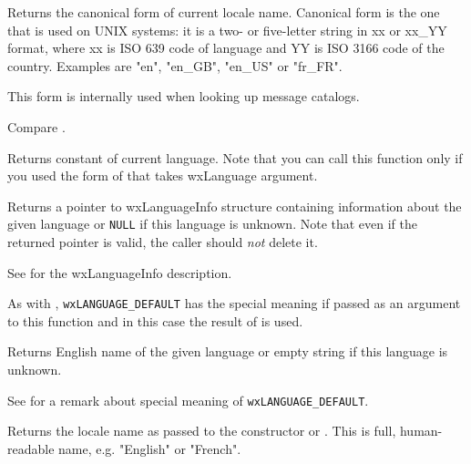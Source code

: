 Returns the canonical form of current locale name. Canonical form is the
one that is used on UNIX systems: it is a two- or five-letter string in xx or
xx\_YY format, where xx is ISO 639 code of language and YY is ISO 3166 code of
the country. Examples are "en", "en\_GB", "en\_US" or "fr\_FR".

This form is internally used when looking up message catalogs.

Compare .




\label{wxlocalegetlanguage}


Returns  constant of current language.
Note that you can call this function only if you used the form of
 that takes wxLanguage argument.


\label{wxlocalegetlanguageinfo}


Returns a pointer to wxLanguageInfo structure containing information about the
given language or {\tt NULL} if this language is unknown. Note that even if the
returned pointer is valid, the caller should {\it not} delete it.

See  for the wxLanguageInfo
description.

As with , \texttt{wxLANGUAGE\_DEFAULT} has the
special meaning if passed as an argument to this function and in this case the
result of  is used.


\label{wxlocalegetlanguagename}


Returns English name of the given language or empty string if this
language is unknown.

See  for a remark about
special meaning of \texttt{wxLANGUAGE\_DEFAULT}.


\label{wxlocalegetlocale}


Returns the locale name as passed to the constructor or 
. This is full, human-readable name,
e.g. "English" or "French".



